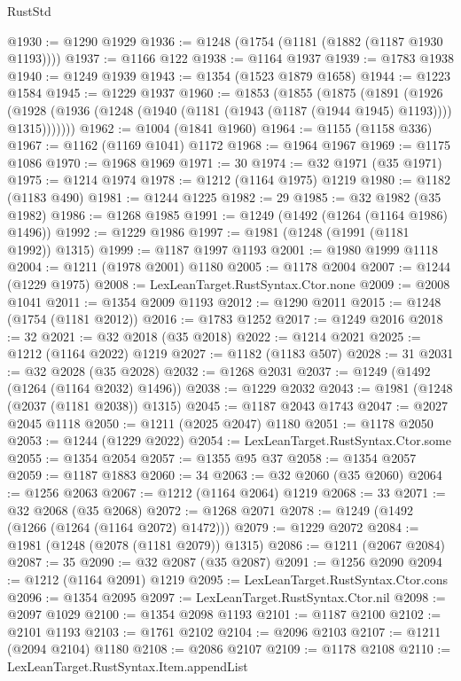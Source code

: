 \begin{lexlean}{RustStd}
\begin{coremodule}
@1930 := @1290 @1929
@1936 := @1248 (@1754 (@1181 (@1882 (@1187 @1930 @1193))))
@1937 := @1166 @122
@1938 := @1164 @1937
@1939 := @1783 @1938
@1940 := @1249 @1939
@1943 := @1354 (@1523 @1879 @1658)
@1944 := @1223 @1584
@1945 := @1229 @1937
@1960 := @1853
    (@1855
      (@1875
        (@1891
          (@1926
            (@1928 (@1936 (@1248 (@1940 (@1181 (@1943 (@1187 (@1944 @1945) @1193)))) @1315)))))))
@1962 := @1004 (@1841 @1960)
@1964 := @1155 (@1158 @336)
@1967 := @1162 (@1169 @1041) @1172
@1968 := @1964 @1967
@1969 := @1175 @1086
@1970 := @1968 @1969
@1971 := 30
@1974 := @32 @1971 (@35 @1971)
@1975 := @1214 @1974
@1978 := @1212 (@1164 @1975) @1219
@1980 := @1182 (@1183 @490)
@1981 := @1244 @1225
@1982 := 29
@1985 := @32 @1982 (@35 @1982)
@1986 := @1268 @1985
@1991 := @1249 (@1492 (@1264 (@1164 @1986) @1496))
@1992 := @1229 @1986
@1997 := @1981 (@1248 (@1991 (@1181 @1992)) @1315)
@1999 := @1187 @1997 @1193
@2001 := @1980 @1999 @1118
@2004 := @1211 (@1978 @2001) @1180
@2005 := @1178 @2004
@2007 := @1244 (@1229 @1975)
@2008 := LexLeanTarget.RustSyntax.Ctor.none
@2009 := @2008 @1041
@2011 := @1354 @2009 @1193
@2012 := @1290 @2011
@2015 := @1248 (@1754 (@1181 @2012))
@2016 := @1783 @1252
@2017 := @1249 @2016
@2018 := 32
@2021 := @32 @2018 (@35 @2018)
@2022 := @1214 @2021
@2025 := @1212 (@1164 @2022) @1219
@2027 := @1182 (@1183 @507)
@2028 := 31
@2031 := @32 @2028 (@35 @2028)
@2032 := @1268 @2031
@2037 := @1249 (@1492 (@1264 (@1164 @2032) @1496))
@2038 := @1229 @2032
@2043 := @1981 (@1248 (@2037 (@1181 @2038)) @1315)
@2045 := @1187 @2043 @1743
@2047 := @2027 @2045 @1118
@2050 := @1211 (@2025 @2047) @1180
@2051 := @1178 @2050
@2053 := @1244 (@1229 @2022)
@2054 := LexLeanTarget.RustSyntax.Ctor.some
@2055 := @1354 @2054
@2057 := @1355 @95 @37
@2058 := @1354 @2057
@2059 := @1187 @1883
@2060 := 34
@2063 := @32 @2060 (@35 @2060)
@2064 := @1256 @2063
@2067 := @1212 (@1164 @2064) @1219
@2068 := 33
@2071 := @32 @2068 (@35 @2068)
@2072 := @1268 @2071
@2078 := @1249 (@1492 (@1266 (@1264 (@1164 @2072) @1472)))
@2079 := @1229 @2072
@2084 := @1981 (@1248 (@2078 (@1181 @2079)) @1315)
@2086 := @1211 (@2067 @2084)
@2087 := 35
@2090 := @32 @2087 (@35 @2087)
@2091 := @1256 @2090
@2094 := @1212 (@1164 @2091) @1219
@2095 := LexLeanTarget.RustSyntax.Ctor.cons
@2096 := @1354 @2095
@2097 := LexLeanTarget.RustSyntax.Ctor.nil
@2098 := @2097 @1029
@2100 := @1354 @2098 @1193
@2101 := @1187 @2100
@2102 := @2101 @1193
@2103 := @1761 @2102
@2104 := @2096 @2103
@2107 := @1211 (@2094 @2104) @1180
@2108 := @2086 @2107
@2109 := @1178 @2108
@2110 := LexLeanTarget.RustSyntax.Item.appendList

\end{coremodule}
\end{lexlean}

